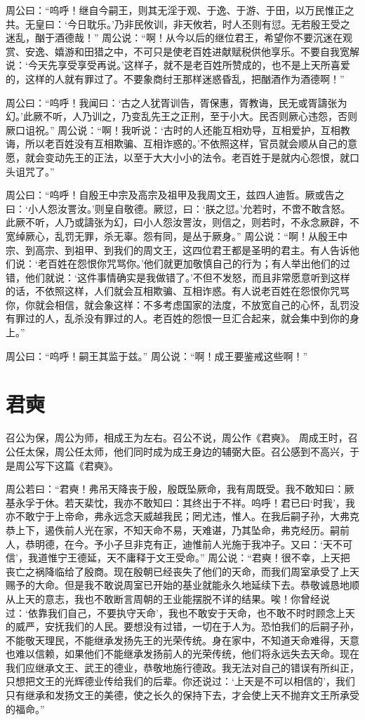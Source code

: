 \documentclass[a4paper,12pt,UTF8,twoside]{ctexbook}
\begin{document}
周公曰：“呜呼！继自今嗣王，则其无淫于观、于逸、于游、于田，以万民惟正之共。无皇曰：‘今日耽乐。’乃非民攸训，非天攸若，时人丕则有愆。无若殷王受之迷乱，酗于酒德哉！”
周公说：“啊！从今以后的继位君王，希望你不要沉迷在观赏、安逸、嬉游和田猎之中，不可只是使老百姓进献赋税供他享乐。不要自我宽解说：‘今天先享受享受再说。’这样子，就不是老百姓所赞成的，也不是上天所喜爱的，这样的人就有罪过了。不要象商纣王那样迷惑昏乱，把酗酒作为酒德啊！”

周公曰：“呜呼！我闻曰：‘古之人犹胥训告，胥保惠，胥教诲，民无或胥譸张为幻。’此厥不听，人乃训之，乃变乱先王之正刑，至于小大。民否则厥心违怨，否则厥口诅祝。”
周公说：“啊！我听说：‘古时的人还能互相劝导，互相爱护，互相教诲，所以老百姓没有互相欺骗、互相诈惑的。’不依照这样，官员就会顺从自己的意愿，就会变动先王的正法，以至于大大小小的法令。老百姓于是就内心怨恨，就口头诅咒了。”

周公曰：“呜呼！自殷王中宗及高宗及祖甲及我周文王，兹四人迪哲。厥或告之曰：‘小人怨汝詈汝。’则皇自敬德。厥愆，曰：‘朕之愆。’允若时，不啻不敢含怒。此厥不听，人乃或譸张为幻，曰小人怨汝詈汝，则信之，则若时，不永念厥辟，不宽绰厥心，乱罚无罪，杀无辜。怨有同，是丛于厥身。”
周公说：“啊！从殷王中宗、到高宗、到祖甲、到我们的周文王，这四位君王都是圣明的君主。有人告诉他们说：‘老百姓在怨恨你咒骂你。’他们就更加敬慎自己的行为；有人举出他们的过错，他们就说：‘这件事情确实是我做错了。’不但不发怒，而且非常愿意听到这样的话，不依照这样，人们就会互相欺骗、互相诈惑。有人说老百姓在怨恨你咒骂你，你就会相信，就会象这样：不多考虑国家的法度，不放宽自己的心怀，乱罚没有罪过的人，乱杀没有罪过的人。老百姓的怨恨一旦汇合起来，就会集中到你的身上。”

周公曰：“呜呼！嗣王其监于兹。”
周公说：“啊！成王要鉴戒这些啊！”

\chapter{君奭}

召公为保，周公为师，相成王为左右。召公不说，周公作《君奭》。
周成王时，召公任太保，周公任太师，他们同时成为成王身边的辅弼大臣。召公感到不高兴，于是周公写下这篇《君奭》。

周公若曰：“君奭！弗吊天降丧于殷，殷既坠厥命，我有周既受。我不敢知曰：厥基永孚于休。若天棐忱，我亦不敢知曰：其终出于不祥。呜呼！君已曰‘时我’，我亦不敢宁于上帝命，弗永远念天威越我民；罔尤违，惟人。在我后嗣子孙，大弗克恭上下，遏佚前人光在家，不知天命不易，天难谌，乃其坠命，弗克经历。嗣前人，恭明德，在今。予小子旦非克有正，迪惟前人光施于我冲子。又曰：‘天不可信’，我道惟宁王德延，天不庸释于文王受命。”
周公说：“君奭！很不幸，上天把丧亡之祸降临给了殷商。现在殷朝已经丧失了他们的天命，而我们周室承受了上天赐予的大命。但是我不敢说周室已开始的基业就能永久地延续下去。恭敬诚恳地顺从上天的意志，我也不敢断言周朝的王业能摆脱不详的结果。唉！你曾经说过：‘依靠我们自己，不要执守天命’，我也不敢安于天命，也不敢不时时顾念上天的威严，安抚我们的人民。要想没有过错，一切在于人为。恐怕我们的后嗣子孙，不能敬天理民，不能继承发扬先王的光荣传统。身在家中，不知道天命难得，天意也难以信赖，如果他们不能继承发扬前人的光荣传统，他们将永远失去天命。现在我们应继承文王、武王的德业，恭敬地施行德政。我无法对自己的错误有所纠正，只想把文王的光辉德业传给我们的后辈。你还说过：‘上天是不可以相信的’，我们只有继承和发扬文王的美德，使之长久的保持下去，才会使上天不抛弃文王所承受的福命。”
\end{document}
